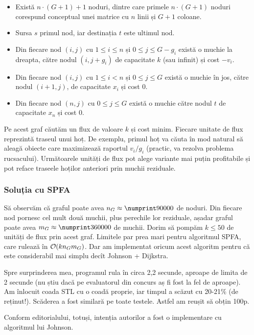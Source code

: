 \documentclass[../main.tex]{subfiles}
\begin{document}
\begin{itemize}
  \item Există $n \cdot (G + 1) + 1$ noduri, dintre care primele $n \cdot (G + 1)$ noduri corespund conceptual unei matrice cu $n$ linii și $G + 1$ coloane.
  \item Sursa $s$ primul nod, iar destinația $t$ este ultimul nod.
  \item Din fiecare nod $(i, j)$ cu $1 \leq i \leq n$ și $0 \leq j \leq G - g_i$ există o muchie la dreapta, către nodul $(i, j + g_i)$ de capacitate $k$ (sau infinit) și cost $-v_i$.
  \item Din fiecare nod $(i, j)$ cu $1 \leq i < n$ și $0 \leq j \leq G$ există o muchie în jos, către nodul $(i + 1, j)$, de capacitate $x_i$ și cost 0.
  \item Din fiecare nod $(n, j)$ cu $0 \leq j \leq G$ există o muchie către nodul $t$ de capacitate $x_n$ și cost 0.
\end{itemize}

Pe acest graf căutăm un flux de valoare $k$ și cost minim. Fiecare unitate de flux reprezintă traseul unui hoț. De exemplu, primul hoț va căuta în mod natural să aleagă obiecte care maximizează raportul $v_i/g_i$ (practic, va rezolva problema rucsacului). Următoarele unități de flux pot alege variante mai puțin profitabile și pot reface traseele hoților anteriori prin muchii reziduale.


\subsubsection*{Soluția cu SPFA}

Să observăm că graful poate avea $n_G \approx \np{90000}$ de noduri. Din fiecare nod pornesc cel mult două muchii, plus perechile lor reziduale, așadar graful poate avea $m_G \approx \np{360000}$ de muchii. Dorim să pompăm $ k \leq 50$ de unități de flux prin acest graf. Limitele par prea mari pentru algoritmul SPFA, care rulează în $\mathcal{O}(k n_G m_G)$. Dar am implementat oricum acest algoritm pentru că este considerabil mai simplu decît Johnson + Dijkstra.

Spre surprinderea mea, programul rula în circa 2,2 secunde, aproape de limita de 2 secunde (nu știu dacă pe evaluatorul din concurs aș fi fost la fel de aproape). Am înlocuit coada STL cu o coadă proprie, iar timpul a scăzut cu 20-21\% (de reținut!). Scăderea a fost similară pe toate testele. Astfel am reușit să obțin 100p.

Conform editorialului, totuși, intenția autorilor a fost o implementare cu algoritmul lui Johnson.
\end{document}

